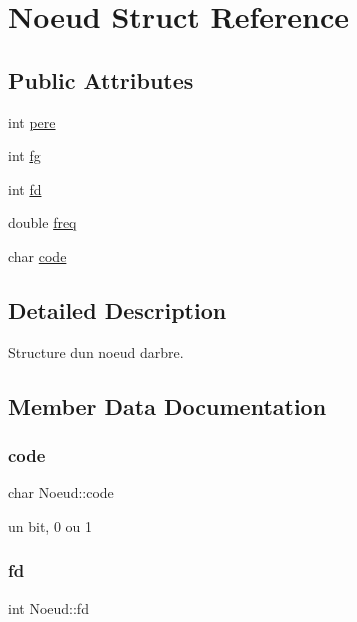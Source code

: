 \hypertarget{structNoeud}{}\section{Noeud Struct Reference}
\label{structNoeud}
\subsection*{Public Attributes}
\begin{DoxyCompactItemize}
\item 
int \hyperlink{structNoeud_a2ea9146a5bd3678a27f8a56c9306de22}{pere}
\item 
int \hyperlink{structNoeud_a2aeffae918ba8274b8b5f75706bb84de}{fg}
\item 
int \hyperlink{structNoeud_a67400f9553fd71df5a67cf32dc2ab639}{fd}
\item 
double \hyperlink{structNoeud_a2678aa0eb590d87e8b61d071c2d5b995}{freq}
\item 
char \hyperlink{structNoeud_ae18bb6fbbfb8cbcd1aec909baad880fc}{code}
\end{DoxyCompactItemize}


\subsection{Detailed Description}
Structure d\textquotesingle{}un noeud d\textquotesingle{}arbre. 

\subsection{Member Data Documentation}
\mbox{\label{structNoeud_ae18bb6fbbfb8cbcd1aec909baad880fc}} 
\subsubsection{\texorpdfstring{code}{code}}
{\footnotesize\ttfamily char Noeud\+::code}

un bit, 0 ou 1 \mbox{\label{structNoeud_a67400f9553fd71df5a67cf32dc2ab639}} 
\subsubsection{\texorpdfstring{fd}{fd}}
{\footnotesize\ttfamily int Noeud\+::fd}

